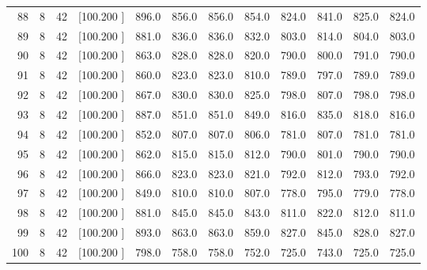 \documentclass[12pt,a4paper]{article}
\begin{document}
\begin{center}
{\begin{tabular}{r r r r r r r r r r r r}
  88&  8& 42&[100.200   ]&   896.0&   856.0&   856.0&   854.0&   824.0&   841.0&   825.0&   824.0\\[-0.02in]
  89&  8& 42&[100.200   ]&   881.0&   836.0&   836.0&   832.0&   803.0&   814.0&   804.0&   803.0\\[-0.02in]
  90&  8& 42&[100.200   ]&   863.0&   828.0&   828.0&   820.0&   790.0&   800.0&   791.0&   790.0\\[-0.02in]
  91&  8& 42&[100.200   ]&   860.0&   823.0&   823.0&   810.0&   789.0&   797.0&   789.0&   789.0\\[-0.02in]
  92&  8& 42&[100.200   ]&   867.0&   830.0&   830.0&   825.0&   798.0&   807.0&   798.0&   798.0\\[-0.02in]
  93&  8& 42&[100.200   ]&   887.0&   851.0&   851.0&   849.0&   816.0&   835.0&   818.0&   816.0\\[-0.02in]
  94&  8& 42&[100.200   ]&   852.0&   807.0&   807.0&   806.0&   781.0&   807.0&   781.0&   781.0\\[-0.02in]
  95&  8& 42&[100.200   ]&   862.0&   815.0&   815.0&   812.0&   790.0&   801.0&   790.0&   790.0\\[-0.02in]
  96&  8& 42&[100.200   ]&   866.0&   823.0&   823.0&   821.0&   792.0&   812.0&   793.0&   792.0\\[-0.02in]
  97&  8& 42&[100.200   ]&   849.0&   810.0&   810.0&   807.0&   778.0&   795.0&   779.0&   778.0\\[-0.02in]
  98&  8& 42&[100.200   ]&   881.0&   845.0&   845.0&   843.0&   811.0&   822.0&   812.0&   811.0\\[-0.02in]
  99&  8& 42&[100.200   ]&   893.0&   863.0&   863.0&   859.0&   827.0&   845.0&   828.0&   827.0\\[-0.02in]
 100&  8& 42&[100.200   ]&   798.0&   758.0&   758.0&   752.0&   725.0&   743.0&   725.0&   725.0\\[-0.02in]

\hline
\end{tabular}}
\end{center}
\end{document}
